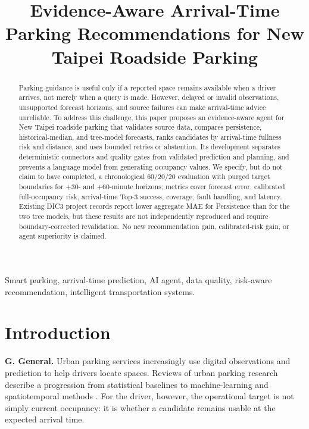 \documentclass[conference,letterpaper,10pt]{IEEEtran}
\begin{document}
\title{Evidence-Aware Arrival-Time Parking Recommendations for New Taipei Roadside Parking}

\author{
}

\maketitle

\begin{abstract}
Parking guidance is useful only if a reported space remains available when a driver arrives, not merely when a query is made. However, delayed or invalid observations, unsupported forecast horizons, and source failures can make arrival-time advice unreliable. To address this challenge, this paper proposes an evidence-aware agent for New Taipei roadside parking that validates source data, compares persistence, historical-median, and tree-model forecasts, ranks candidates by arrival-time fullness risk and distance, and uses bounded retries or abstention. Its development separates deterministic connectors and quality gates from validated prediction and planning, and prevents a language model from generating occupancy values. We specify, but do not claim to have completed, a chronological 60/20/20 evaluation with purged target boundaries for +30- and +60-minute horizons; metrics cover forecast error, calibrated full-occupancy risk, arrival-time Top-3 success, coverage, fault handling, and latency. Existing DIC3 project records report lower aggregate MAE for Persistence than for the two tree models, but these results are not independently reproduced and require boundary-corrected revalidation. No new recommendation gain, calibrated-risk gain, or agent superiority is claimed.
\end{abstract}

\begin{IEEEkeywords}
Smart parking, arrival-time prediction, AI agent, data quality, risk-aware recommendation, intelligent transportation systems.
\end{IEEEkeywords}

\section{Introduction}
\noindent\textbf{G. General.} Urban parking services increasingly use digital observations and prediction to help drivers locate spaces. Reviews of urban parking research describe a progression from statistical baselines to machine-learning and spatiotemporal methods \cite{ma2024}. For the driver, however, the operational target is not simply current occupancy: it is whether a candidate remains usable at the expected arrival time.
\end{document}
